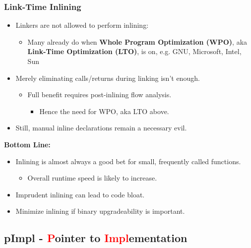 \subsubsection{Link-Time Inlining}
\begin{itemize}
	\item Linkers are not allowed to perform inlining:
	\begin{itemize}
		\item Many already do when \textbf{Whole Program Optimization (WPO)}, aka \textbf{Link-Time Optimization (LTO)}, is on, e.g. GNU, Microsoft, Intel, Sun
	\end{itemize}
	\item Merely eliminating calls/returns during linking isn't enough.
	\begin{itemize}
		\item Full benefit requires post-inlining flow analysis.
		\begin{itemize}
			\item Hence the need for WPO, aka LTO above.
		\end{itemize}
	\end{itemize}
	\item Still, manual inline declarations remain a necessary evil.
\end{itemize}
\textbf{Bottom Line:}
\begin{itemize}
	\item Inlining is almost always a good bet for small, frequently called functions.
	\begin{itemize}
		\item Overall runtime speed is likely to increase.
	\end{itemize}
	\item Imprudent inlining can lead to code bloat.
	\item Minimize inlining if binary upgradeability is important.
\end{itemize}

\subsection[pImpl]{pImpl - \textcolor{red}{P}ointer to \textcolor{red}{Impl}ementation}
\label{sec:pimpl}

